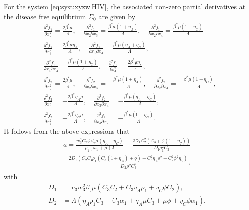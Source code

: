 \documentclass{my_aims}
\theoremstyle{definition}
\begin{document}
For the system \eqref{eq:syst:xyzw:HIV}, the associated non-zero partial
derivatives at the disease free equilibrium $\Sigma_0$ are given by
\begin{equation*}
\begin{split}
&\frac{\partial^2 f_1}{\partial x_2^2} = \frac{2 \beta^* \mu}{\Lambda}, \quad
\frac{\partial^2 f_1}{\partial x_2 \partial x_3}= \frac{\beta^* \mu (1+\eta_A)}{\Lambda}, \quad
\frac{\partial^2 f_1}{\partial x_2 \partial x_4} = \frac{\beta^* \mu (1+\eta_C)}{\Lambda},\\
&\frac{\partial^2 f_1}{\partial x_3^2} = \frac{2 \beta^* \mu \eta_A}{\Lambda}, \quad
\frac{\partial^2 f_1}{\partial x_3 \partial x_4} = \frac{\beta^* \mu (\eta_A+\eta_C)}{\Lambda}, \\
&\frac{\partial^2 f_1}{\partial x_4 \partial x_2} = \frac{\beta^* \mu (1+\eta_C)}{\Lambda}, \quad
\frac{\partial^2 f_1}{\partial x_4^2} = \frac{2 \beta^* \mu \eta_C }{\Lambda}, \\
&\frac{\partial^2 f_2}{\partial x_2^2} = \frac{2 \beta^* \mu}{\Lambda}, \quad
\frac{\partial^2 f_2}{\partial x_2 \partial x_3}= -\frac{\beta^* \mu (1+\eta_A)}{\Lambda}, \quad
\frac{\partial^2 f_2}{\partial x_2 \partial x_4} = -\frac{\beta^* \mu (1+\eta_C)}{\Lambda}, \\
&\frac{\partial^2 f_2}{\partial x_3^2} = -\frac{2 \beta^* \eta_A \mu}{\Lambda}, \quad
\frac{\partial^2 f_2}{\partial x_3 \partial x_4}= -\frac{\beta^* \mu (\eta_A+\eta_C)}{\Lambda},\\
&\frac{\partial^2 f_2}{\partial x_4^2} = -\frac{2 \beta^* \eta_C \mu}{\Lambda}, \quad
\frac{\partial^2 f_2}{\partial x_4 \partial x_2}= -\frac{\beta^* \mu (1+\eta_C)}{\Lambda}.
\end{split}
\end{equation*}
It follows from the above expressions that
\begin{multline*}
a= \frac{w_3^2 C_2 \phi\, \beta_2 \mu \left(\eta_A + \eta_C \right)}{\rho_1 \left(\omega_1+\mu \right)\Lambda}
-\frac{2 D_1 C_2^2 \left(C_3 + \phi(1 + \eta_C)\right)}{D_2 \rho_1^2 C_3}\\
-\frac{2 D_1 \left(C_2 C_3 \rho_1 \left(C_3(1+\eta_A) + \phi\right)
+ C_3^2 \eta_A \rho_1^2 + C_2^2 \phi^2 \eta_C \right)}{D_2 \rho_1^2 C_3^2},
\end{multline*}
with
\begin{equation*}
\begin{split}
D_1 &= v_3 w_3^{2} \beta_2 \mu \left( C_3 C_2 + C_3 \eta_A \rho_1 + \eta_C \phi C_2 \right),\\
D_2 &= \Lambda \left( \eta_A \rho_1 C_3 + C_3 \alpha_1
+ \eta_A \mu C_3 + \mu \phi + \eta_C \phi \alpha_1 \right).
\end{split}
\end{equation*}
\end{document}
